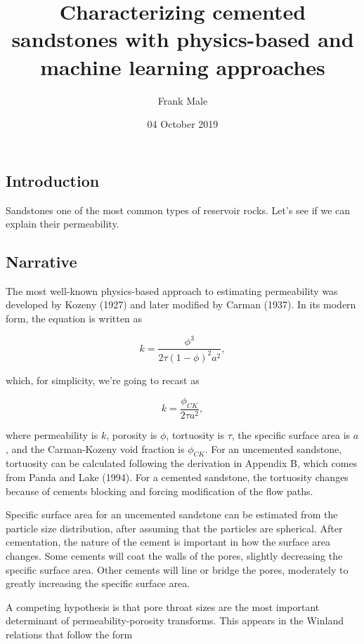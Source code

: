 \documentclass[]{article}
\title{Characterizing cemented sandstones with physics-based and machine
learning approaches}
\author{Frank Male}
\date{04 October 2019}
\begin{document}
\maketitle

\subsection{Introduction}\label{introduction}

Sandstones one of the most common types of reservoir rocks. Let's see if
we can explain their permeability.

\subsection{Narrative}\label{narrative}

The most well-known physics-based approach to estimating permeability
was developed by Kozeny (1927) and later modified by Carman (1937). In
its modern form, the equation is written as

\begin{equation}
k = \frac{\phi^3}{2\tau(1-\phi)^2 a^2},
\end{equation}

which, for simplicity, we're going to recast as

\begin{equation}
k = \frac{\phi_{CK}}{2\tau a^2},
\end{equation}

where permeability is \(k\), porosity is \(\phi\), tortuosity is
\(\tau\), the specific surface area is \(a\), and the Carman-Kozeny void
fraction is \(\phi_{CK}\). For an uncemented sandstone, tortuosity can
be calculated following the derivation in Appendix B, which comes from
Panda and Lake (1994). For a cemented sandstone, the tortuosity changes
because of cements blocking and forcing modification of the flow paths.

Specific surface area for an uncemented sandstone can be estimated from
the particle size distribution, after assuming that the particles are
spherical. After cementation, the nature of the cement is important in
how the surface area changes. Some cements will coat the walls of the
pores, slightly decreasing the specific surface area. Other cements will
line or bridge the pores, moderately to greatly increasing the specific
surface area.

A competing hypothesis is that pore throat sizes are the most important
determinant of permeability-porosity transforms. This appears in the
Winland relations that follow the form
\end{document}
